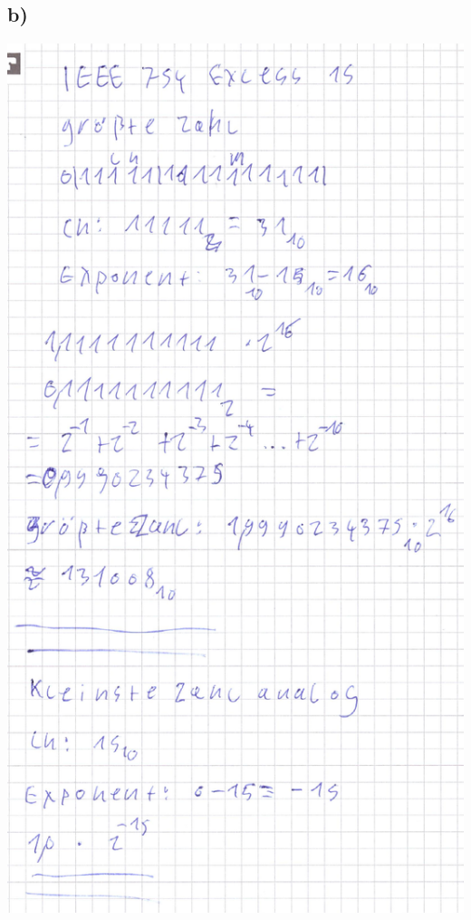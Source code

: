 \documentclass{article}
\begin{document}
	\subsection*{b)}
	\includegraphics[width=\linewidth]{"95b"}
\end{document}

